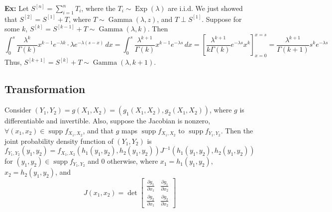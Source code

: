 \documentclass[10pt,letterpaper]{article}
\newcommand{\n}{\hfill\break}
\newcommand{\hangblock}[2]{\par\noindent\settowidth{\hangindent}{\textbf{#1: }}\textbf{#1: }\nolinebreak#2}
\newcommand{\ex}[1]{\hangblock{Ex}{#1}}
\DeclareMathOperator{\Exp}{Exp}
\DeclareMathOperator{\DistGamma}{Gamma}
\newcommand{\inv}{^{-1}}
\DeclareMathOperator{\supp}{supp}
\newcommand{\pd}[2]{\frac{\partial{}#1}{\partial{}#2}}
\renewcommand{\brack}[1]{\left[#1\right]}
\begin{document}
\ex{
	Let $S^{[n]}=\sum_{i=1}^{n}T_{i}$, where the $T_{i}\sim\Exp(\lambda)$ are i.i.d. We just showed that $S^{[2]}=S^{[1]}+T$, where $T\sim\DistGamma(\lambda,z)$, and $T\perp{}S^{[1]}$. Suppose for some $k$, $S^{[k]}=S^{[k-1]}+T\sim\DistGamma(\lambda,k)$. Then
	\[
		\int_{0}^{s}\frac{\lambda^{k}}{\Gamma(k)}x^{k-1}e^{-\lambda{}k}\cdot\lambda{}e^{-\lambda(s-x)}\,dx=\int_{0}^{s}\frac{\lambda^{k+1}}{\Gamma(k)}x^{k-1}e^{-\lambda{}s}\,dx=\brack{\frac{\lambda^{k+1}}{k\Gamma(k)}e^{-\lambda{}s}x^{k}}_{x=0}^{x=s}=\frac{\lambda^{k+1}}{\Gamma(k+1)}s^{k}e^{-\lambda{}s}
	\]
	Thus, $S^{[k+1]}=S^{[k]}+T\sim\DistGamma(\lambda,k+1)$.\n
}

\newpage
\subsection*{Transformation}

\par\noindent
Consider $(Y_{1},Y_{2})=g(X_{1},X_{2})=(g_{1}(X_{1},X_{2}),g_{2}(X_{1},X_{2}))$, where $g$ is differentiable and invertible. Also, suppose the Jacobian is nonzero, $\forall(x_{1},x_{2})\in\supp{}f_{X_{1},X_{2}}$, and that $g$ maps $\supp{}f_{X_{1},X_{2}}$ to $\supp{}f_{Y_{1},Y_{2}}$. Then the joint probability density function of $(Y_{1},Y_{2})$ is
\[
	f_{Y_{1},Y_{2}}(y_{1},y_{2})=f_{X_{1},X_{2}}(h_{1}(y_{1},y_{2}),h_{2}(y_{1},y_{2}))J\inv(h_{1}(y_{1},y_{2}),h_{2}(y_{1},y_{2}))
\]
for $(y_{1},y_{2})\in\supp{}f_{Y_{1},Y_{2}}$ and $0$ otherwise, where $x_{1}=h_{1}(y_{1},y_{2})$, $x_{2}=h_{2}(y_{1},y_{2})$, and
\[
	J(x_{1},x_{2})=\det \begin{bmatrix}
		\pd{g_{1}}{x_{1}} & \pd{g_{1}}{x_{2}}\\
		\pd{g_{2}}{x_{1}} & \pd{g_{2}}{x_{2}}
	\end{bmatrix}
\]
\end{document}
